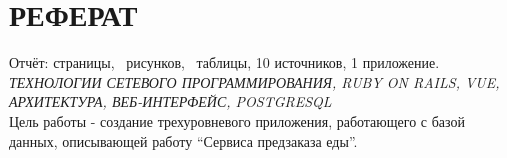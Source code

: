 \setcounter{page}{2}

\section*{РЕФЕРАТ}
{
	Отчёт:
	\pageref{LastPage} страницы,
	\totalfigures\ рисунков,
	\totaltables\ таблицы,
	10 источников,
	1 приложение.\\

	\textit{ТЕХНОЛОГИИ СЕТЕВОГО ПРОГРАММИРОВАНИЯ, RUBY ON RAILS, VUE, АРХИТЕКТУРА, ВЕБ-ИНТЕРФЕЙС, POSTGRESQL}\\

	Цель работы - создание трехуровневого приложения, работающего с базой данных, описывающей работу \enquote{Сервиса предзаказа еды}.
}
\newpage

\newpage
\tableofcontents


\newpage
{}
{}
